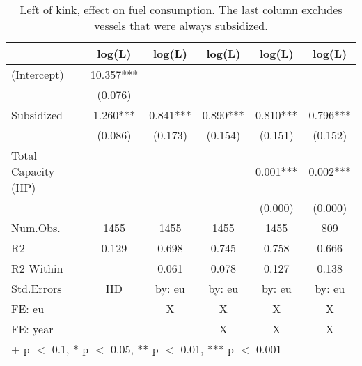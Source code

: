 \begin{table}

\caption{\label{tab:}Left of kink, effect on fuel consumption. The last column excludes vessels that were always subsidized.}
\centering
\begin{tabular}[t]{lccccc}
\toprule
  & log(L) & log(L)  & log(L)   & log(L)    & log(L)    \\
\midrule
(Intercept) & \num{10.357}*** &  &  &  & \\
 & (\num{0.076}) &  &  &  & \\
Subsidized & \num{1.260}*** & \num{0.841}*** & \num{0.890}*** & \num{0.810}*** & \num{0.796}***\\
 & (\num{0.086}) & (\num{0.173}) & (\num{0.154}) & (\num{0.151}) & (\num{0.152})\\
Total Capacity (HP) &  &  &  & \num{0.001}*** & \num{0.002}***\\
 &  &  &  & (\num{0.000}) & (\num{0.000})\\
\midrule
Num.Obs. & \num{1455} & \num{1455} & \num{1455} & \num{1455} & \num{809}\\
R2 & \num{0.129} & \num{0.698} & \num{0.745} & \num{0.758} & \num{0.666}\\
R2 Within &  & \num{0.061} & \num{0.078} & \num{0.127} & \num{0.138}\\
Std.Errors & IID & by: eu & by: eu & by: eu & by: eu\\
FE: eu &  & X & X & X & X\\
FE: year &  &  & X & X & X\\
\bottomrule
\multicolumn{6}{l}{\rule{0pt}{1em}+ p $<$ 0.1, * p $<$ 0.05, ** p $<$ 0.01, *** p $<$ 0.001}\\
\end{tabular}
\end{table}
